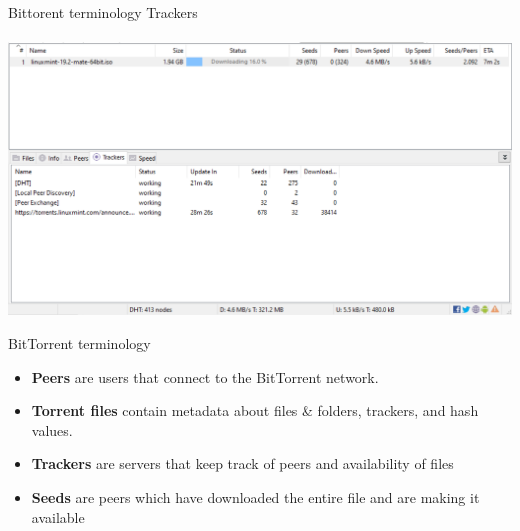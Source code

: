 \documentclass{beamer}
\begin{document}
        \begin{frame}{Bittorent terminology}
            Trackers \\ \\
             \centering
            \includegraphics[scale=0.5]{bit-3.PNG}
        \end{frame}
        
        \begin{frame}{BitTorrent terminology}
            \begin{itemize} %
                \item \textbf{Peers} are users that connect to the BitTorrent network.
                \item \textbf{Torrent files} contain metadata about files \& folders, trackers, and hash values.
                \item \textbf{Trackers} are servers that keep track of peers and availability of files
                \item \textbf{Seeds} are peers which have downloaded the entire file and are making it available
            \end{itemize}
        \end{frame}
\end{document}
